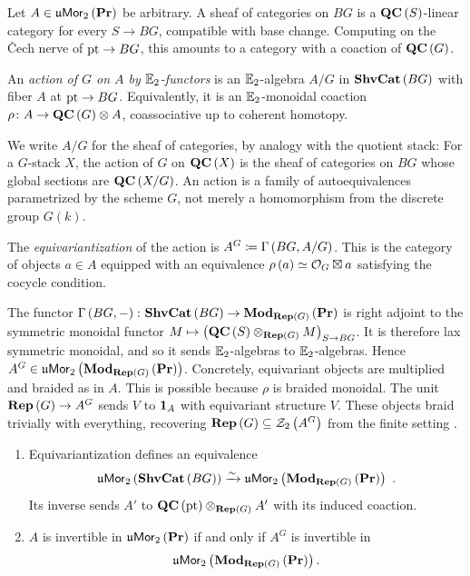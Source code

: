 Let $A\in\mathfrak{u}\mathsf{Mor}_2\left(\mathbf{Pr}\right)$ be arbitrary.
A sheaf of categories on $BG$ is a $\mathbf{QC}\left(S\right)$-linear category for every
$S\to BG$, compatible with base change.
Computing on the \v{C}ech nerve of $\text{pt}\to BG$, this amounts to a category with a coaction of
$\mathbf{QC}\left(G\right)$.

\begin{defn}
An \emph{action of $G$ on $A$ by $\mathbb{E}_2$-functors} is an $\mathbb{E}_2$-algebra $A/G$ in
$\mathbf{ShvCat}\left(BG\right)$ with fiber $A$ at $\text{pt}\to BG$.
Equivalently, it is an $\mathbb{E}_2$-monoidal coaction
$\rho\colon A\to\mathbf{QC}\left(G\right)\otimes A$, coassociative up to coherent homotopy.
\end{defn}

We write $A/G$ for the sheaf of categories, by analogy with the quotient stack: For a
$G$-stack $X$, the action of $G$ on $\mathbf{QC}\left(X\right)$ is the sheaf of categories on $BG$
whose global sections are $\mathbf{QC}\left(X/G\right)$.
An action is a family of autoequivalences parametrized by the scheme $G$, not merely a
homomorphism from the discrete group $G\left(k\right)$.

\begin{defn}
The \emph{equivariantization} of the action is $A^G\coloneqq\Gamma\left(BG,A/G\right)$.
This is the category of objects $a\in A$ equipped with an equivalence
$\rho\left(a\right)\simeq\mathcal{O}_G\boxtimes a$ satisfying the cocycle condition.
\end{defn}

The functor $\Gamma\left(BG,-\right)\colon\mathbf{ShvCat}\left(BG\right)\to\mathbf{Mod}_{\mathbf{Rep}\left(G\right)}\left(\mathbf{Pr}\right)$ is right
adjoint to the symmetric monoidal functor
$M\mapsto\left(\mathbf{QC}\left(S\right)\otimes_{\mathbf{Rep}\left(G\right)}M\right)_{S\to BG}$.
It is therefore lax symmetric monoidal, and so it sends $\mathbb{E}_2$-algebras to $\mathbb{E}_2$-algebras.
Hence $A^G\in\mathfrak{u}\mathsf{Mor}_2\left(\mathbf{Mod}_{\mathbf{Rep}\left(G\right)}\left(\mathbf{Pr}\right)\right)$.
Concretely, equivariant objects are multiplied and braided as in $A$.
This is possible because $\rho$ is braided monoidal.
The unit $\mathbf{Rep}\left(G\right)\to A^G$ sends $V$ to $\mathbf{1}_A$ with equivariant structure $V$.
These objects braid trivially with everything, recovering
$\mathbf{Rep}\left(G\right)\subseteq \mathcal{Z}_2\left(A^G\right)$ from the finite setting \cite{DGNO}.

\begin{prop}
\label{prop:equiv}
\leavevmode
\begin{enumerate}
\item Equivariantization defines an equivalence
\begin{equation*}
\umor_2\left(\ShvCat\left(BG\right)\right) \lto{\sim}
\umor_2\left(\Mod_{\Rep\left(G\right)}\left(\Pre\right)\right)\ .
\end{equation*}
Its inverse sends $A'$ to
$\mathbf{QC}\left(\text{pt}\right)\otimes_{\mathbf{Rep}\left(G\right)}A'$ with its induced coaction.
\item $A$ is invertible in $\mathfrak{u}\mathsf{Mor}_2\left(\mathbf{Pr}\right)$ if and only if $A^G$ is invertible in
\begin{equation*}
\mathfrak{u}\mathsf{Mor}_2\left(\mathbf{Mod}_{\mathbf{Rep}\left(G\right)}\left(\mathbf{Pr}\right)\right).
\end{equation*}
\end{enumerate}
\end{prop}

